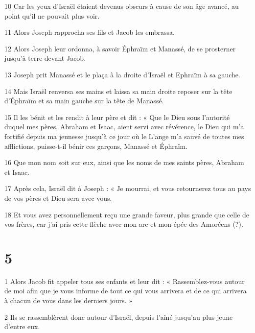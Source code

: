 \par 10 Car les yeux d'Israël étaient devenus obscurs à cause de son âge avancé, au point qu'il ne pouvait plus voir.

\par 11 Alors Joseph rapprocha ses fils et Jacob les embrassa.

\par 12 Alors Joseph leur ordonna, à savoir Éphraïm et Manassé, de se prosterner jusqu'à terre devant Jacob.

\par 13 Joseph prit Manassé et le plaça à la droite d'Israël et Ephraïm à sa gauche.

\par 14 Mais Israël renversa ses mains et laissa sa main droite reposer sur la tête d'Éphraïm et sa main gauche sur la tête de Manassé.

\par 15 Il les bénit et les rendit à leur père et dit : « Que le Dieu sous l'autorité duquel mes pères, Abraham et Isaac, aient servi avec révérence, le Dieu qui m'a fortifié depuis ma jeunesse jusqu'à ce jour où le L'ange m'a sauvé de toutes mes afflictions, puisse-t-il bénir ces garçons, Manassé et Éphraïm.

\par 16 Que mon nom soit sur eux, ainsi que les noms de mes saints pères, Abraham et Isaac.

\par 17 Après cela, Israël dit à Joseph : « Je mourrai, et vous retournerez tous au pays de vos pères et Dieu sera avec vous.

\par 18 Et vous avez personnellement reçu une grande faveur, plus grande que celle de vos frères, car j'ai pris cette flèche avec mon arc et mon épée des Amoréens (?).

\chapter{5}

\par 1 Alors Jacob fit appeler tous ses enfants et leur dit : « Rassemblez-vous autour de moi afin que je vous informe de tout ce qui vous arrivera et de ce qui arrivera à chacun de vous dans les derniers jours. »

\par 2 Ils se rassemblèrent donc autour d'Israël, depuis l'aîné jusqu'au plus jeune d'entre eux.

